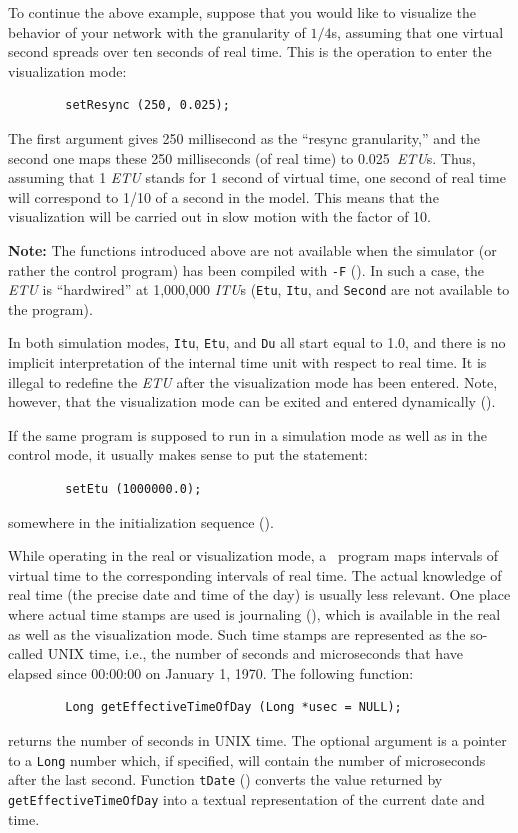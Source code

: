 To continue the above example, suppose that you would like to visualize
the behavior of your network with the granularity of $1/4$s, assuming that
one virtual second spreads over ten seconds of real time.
This is the operation to enter the visualization mode:
\begin{verbatim}
        setResync (250, 0.025);
\end{verbatim}
\noindent
The first argument gives 250 millisecond as the ``resync granularity,''
and the second one maps these 250 milliseconds (of real time) to
0.025~{\em ETU\/}s.
Thus, assuming that 1 {\em ETU\/} stands for
1 second of virtual time, one second of
real time will correspond to 1/10 of a second in the model.
This means that the
visualization will be carried out in slow motion with the
factor of 10.

\medskip

\noindent
{\bf Note:} The functions introduced above are not available when
the simulator (or rather the control program) has been compiled with
{\tt -F} ().
In such a case, the {\em ETU\/} is ``hardwired'' at 1,000,000
{\em ITU\/}s ({\tt Etu}, {\tt Itu}, and {\tt Second} are not available
to the program).

\medskip

In both simulation modes,
{\tt Itu}, {\tt Etu}, and {\tt Du} all start equal to 1.0,
and there is no implicit interpretation of the internal time unit with
respect to real time.
It is illegal to redefine the {\em ETU\/} after the visualization mode
has been entered.
Note, however, that the visualization mode can be exited and entered
dynamically ().

If the same program is supposed to run in a simulation mode as well as in
the control mode, it usually makes sense to put the statement:
\begin{verbatim}
        setEtu (1000000.0);
\end{verbatim}
\noindent
somewhere in the initialization sequence ().

While operating in the real or visualization mode,
a \smurph\ program maps intervals of
virtual time to the corresponding intervals of real time.
The actual knowledge of real time (the precise date and time of the day) is
usually less relevant.
One place where actual time stamps are used is journaling
(), which is available in the real as well as the
visualization mode.
Such time stamps are represented as the so-called UNIX time, i.e.,
the number of seconds and microseconds that have elapsed
since 00:00:00 on January 1, 1970.
The following function:
\begin{verbatim}
        Long getEffectiveTimeOfDay (Long *usec = NULL);
\end{verbatim}
returns the number of seconds in UNIX time.
The optional argument is a pointer to a {\tt Long} number which,
if specified, will contain the number of microseconds after the
last second.
Function {\tt tDate} ()
converts the value returned by {\tt getEffectiveTimeOfDay} into a textual
representation of the current date and time.

